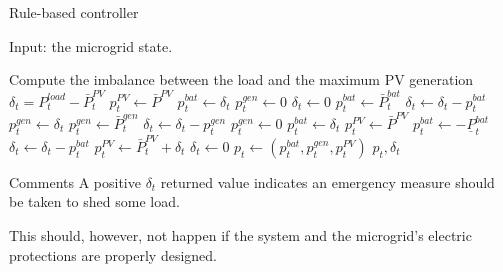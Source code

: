 \begin{frame} {Rule-based controller}

\tiny

Input: the microgrid state.
\begin{multicols}{2}
   \begin{algorithmic}
    \State Compute the imbalance between the load and the maximum PV generation $\delta_t = P^{load}_t - \bar{P}^{PV}_t$
        \State $p^{PV}_t \gets \bar{P}^{PV}$ 
        \State $p^{bat}_t \gets \delta_t$ %
        \State $p^{gen}_t \gets 0$ %
        \State $\delta_t \gets 0$
        \Else{}
                \State $p^{bat}_t \gets \bar{P}^{bat}_t$ 
                \State $\delta_t \gets \delta_t - p^{bat}_t$
                \State $p^{gen}_t \gets \delta_t$
            \Else
                \State $p^{gen}_t \gets \bar{P}^{gen}_t$
                \State $\delta_t \gets \delta_t - p^{gen}_t$
            \EndIf
        \EndIf
    \Else {}
        \State $p^{gen}_t \gets 0$ 
            \State $p^{bat}_t \gets \delta_t$
            \State $p^{PV}_t \gets \bar{P}^{PV}$ 
        \Else {}
            \State $p^{bat}_t \gets -\underline{P}^{bat}_t$
            \State $\delta_t \leftarrow \delta_t - p^{bat}_t$
            \State $p^{PV}_t \gets \bar{P}^{PV}_t + \delta_t$
        \EndIf {}
        \State $\delta_t \gets 0$
        \EndIf
    \State $p_t \gets (p^{bat}_t, p^{gen}_t, p^{PV}_t)$
    \Return $p_t, \delta_t$
\end{algorithmic}
\end{multicols}
\end{frame}

\begin{frame}{Comments}
    A positive $\delta_t$ returned value indicates an emergency measure should be taken to shed some load. 
    
    This should, however, not happen if the system and the microgrid's electric protections are properly designed. 
\end{frame}

